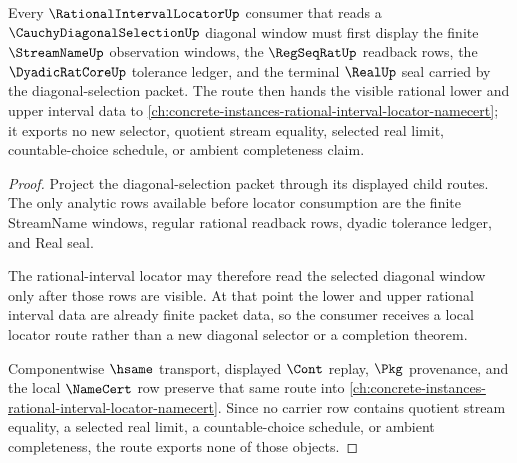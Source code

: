 \begin{theorem}
\label{thm:cauchy-diagonal-selection-orphan-route}
Every $\RationalIntervalLocatorUp$ consumer that reads a $\CauchyDiagonalSelectionUp$ diagonal window must first display the finite $\StreamNameUp$ observation windows, the $\RegSeqRatUp$ readback rows, the $\DyadicRatCoreUp$ tolerance ledger, and the terminal $\RealUp$ seal carried by the diagonal-selection packet. The route then hands the visible rational lower and upper interval data to \autoref{ch:concrete-instances-rational-interval-locator-namecert}; it exports no new selector, quotient stream equality, selected real limit, countable-choice schedule, or ambient completeness claim.
\end{theorem}
\begin{proof}
Project the diagonal-selection packet through its displayed child routes. The only analytic rows available before locator consumption are the finite StreamName windows, regular rational readback rows, dyadic tolerance ledger, and Real seal.

The rational-interval locator may therefore read the selected diagonal window only after those rows are visible. At that point the lower and upper rational interval data are already finite packet data, so the consumer receives a local locator route rather than a new diagonal selector or a completion theorem.

Componentwise $\hsame$ transport, displayed $\Cont$ replay, $\Pkg$ provenance, and the local $\NameCert$ row preserve that same route into \autoref{ch:concrete-instances-rational-interval-locator-namecert}. Since no carrier row contains quotient stream equality, a selected real limit, a countable-choice schedule, or ambient completeness, the route exports none of those objects.
\end{proof}

